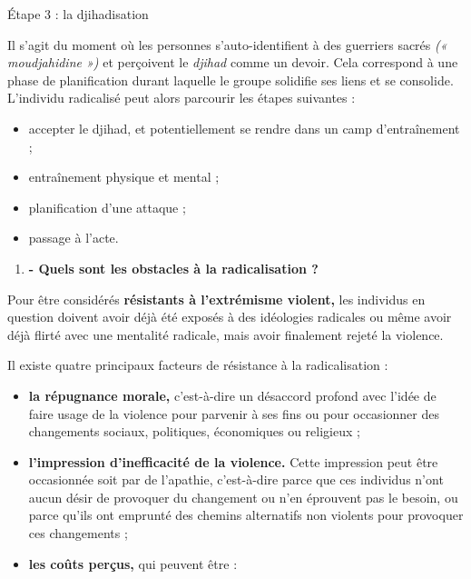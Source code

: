 Étape 3 : la djihadisation


Il s'agit du moment où les personnes s'auto-identifient à des guerriers
sacrés \emph{(« moudjahidine »)} et perçoivent le \emph{djihad} comme un
devoir. Cela correspond à une phase de planification durant laquelle le
groupe solidifie ses liens et se consolide. L'individu radicalisé peut
alors parcourir les étapes suivantes :


\begin{itemize}
\item
  
  accepter le djihad, et potentiellement se rendre dans un camp
  d'entraînement ;
  
\item
  
  entraînement physique et mental ;
  
\item
  
  planification d'une attaque ;
  
\item
  
  passage à l'acte.
  
\end{itemize}

\begin{enumerate}
\def\labelenumi{\arabic{enumi}.}
\setcounter{enumi}{4}
\item
  \textbf{- Quels sont les obstacles à la radicalisation ?}
\end{enumerate}


Pour être considérés \textbf{résistants à l'extrémisme violent,} les
individus en question doivent avoir déjà été exposés à des idéologies
radicales ou même avoir déjà flirté avec une mentalité radicale, mais
avoir finalement rejeté la violence.

Il existe quatre principaux facteurs de résistance à la radicalisation :


\begin{itemize}
\item
  
  \textbf{la répugnance morale,} c'est-à-dire un désaccord profond avec
  l'idée de faire usage de la violence pour parvenir à ses fins ou pour
  occasionner des changements sociaux, politiques, économiques ou
  religieux ;
  
\item
  
  \textbf{l'impression d'inefficacité de la violence.} Cette impression
  peut être occasionnée soit par de l'apathie, c'est-à-dire parce que
  ces individus n'ont aucun désir de provoquer du changement ou n'en
  éprouvent pas le besoin, ou parce qu'ils ont emprunté des chemins
  alternatifs non violents pour provoquer ces changements ;
  
\item
  
  \textbf{les coûts perçus,} qui peuvent être :
  
\end{itemize}

